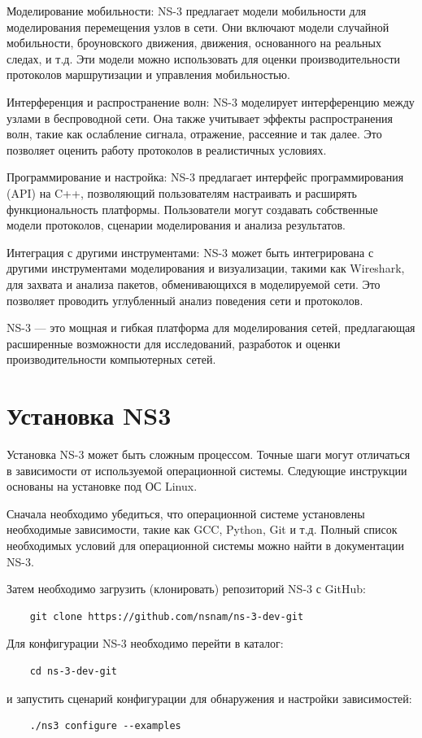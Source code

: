 Моделирование мобильности: NS-3 предлагает модели мобильности для
моделирования перемещения узлов в сети. Они включают модели случайной
мобильности, броуновского движения, движения, основанного на реальных
следах, и т.д. Эти модели можно использовать для оценки
производительности протоколов маршрутизации и управления мобильностью.

Интерференция и распространение волн: NS-3 моделирует интерференцию
между узлами в беспроводной сети. Она также учитывает эффекты
распространения волн, такие как ослабление сигнала, отражение,
рассеяние и так далее. Это позволяет оценить работу протоколов в
реалистичных условиях.

Программирование и настройка: NS-3 предлагает интерфейс
программирования (API) на C++, позволяющий пользователям настраивать и
расширять функциональность платформы. Пользователи могут создавать
собственные модели протоколов, сценарии моделирования и анализа
результатов.

Интеграция с другими инструментами: NS-3 может быть интегрирована с
другими инструментами моделирования и визуализации, такими как
Wireshark, для захвата и анализа пакетов, обменивающихся в
моделируемой сети. Это позволяет проводить углубленный анализ
поведения сети и протоколов.

NS-3 --- это мощная и гибкая платформа для моделирования сетей,
предлагающая расширенные возможности для исследований, разработок и
оценки производительности компьютерных сетей.

\section{Установка NS3}
Установка NS-3 может быть сложным процессом. 
Точные шаги могут отличаться в зависимости от используемой операционной
системы. Следующие инструкции основаны на установке под ОС Linux.

Сначала необходимо убедиться, что операционной системе установлены
необходимые зависимости, такие как GCC, Python, Git и т.д. Полный
список необходимых условий для  операционной системы можно найти
в документации NS-3.

Затем необходимо загрузить (клонировать) репозиторий NS-3 с GitHub:
\begin{verbatim}
    git clone https://github.com/nsnam/ns-3-dev-git
\end{verbatim}

Для конфигурации NS-3 необходимо перейти в каталог:
\begin{verbatim}
    cd ns-3-dev-git
\end{verbatim}
и запустить сценарий конфигурации для обнаружения и настройки зависимостей:
\begin{verbatim}
    ./ns3 configure --examples
\end{verbatim}

